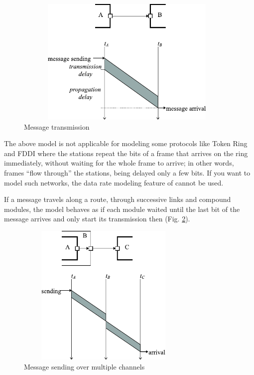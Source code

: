 \begin{figure}[htbp]
\begin{center}
\includegraphics[width=4.301in, height=2.417in]{figures/usmanFig4}
\caption{Message transmission}
\label{fig:ch-overview:message-transm}
\end{center}
\end{figure}

The above model is not applicable for modeling some protocols like
Token Ring and FDDI where the stations repeat the bits of a frame that
arrives on the ring immediately, without waiting for the whole frame
to arrive; in other words, frames ``flow through'' the stations, being
delayed only a few bits. If you want to model such networks, the data
rate modeling feature of {\opp} cannot be used.

If a message travels along a route, through successive links and
compound modules, the model behaves as if each module waited until the
last bit of the message arrives and only start its transmission then
(Fig. \ref{fig:ch-overview:msg-multiple-ch}).

\begin{figure}[htbp]
\begin{center}
\includegraphics[width=3.330in, height=2.692in]{figures/usmanFig5}
\caption{Message sending over multiple channels}
\label{fig:ch-overview:msg-multiple-ch}
\end{center}
\end{figure}

